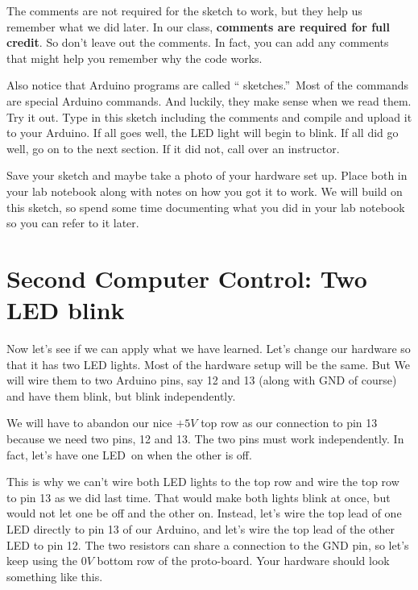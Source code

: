 The comments are not required for the sketch to work, but they help us
remember what we did later. In our class, \textbf{comments are required for
full credit}. So don't leave out the comments. In fact, you can add any
comments that might help you remember why the code works.

Also notice that Arduino programs are called \textquotedblleft
sketches.\textquotedblright\ Most of the commands are special Arduino
commands. And luckily, they make sense when we read them. Try it out. Type
in this sketch including the comments and compile and upload it to your
Arduino. If all goes well, the LED light will begin to blink. If all did go
well, go on to the next section. If it did not, call over an instructor.

Save your sketch and maybe take a photo of your hardware set up. Place both
in your lab notebook along with notes on how you got it to work. We will
build on this sketch, so spend some time documenting what you did in your
lab notebook so you can refer to it later.

\section{Second Computer Control: Two LED blink}

Now let's see if we can apply what we have learned. Let's change our
hardware so that it has two LED lights. Most of the hardware setup will be
the same. But We will wire them to two Arduino pins, say 12 and 13 (along
with GND of course) and have them blink, but blink independently.

We will have to abandon our nice $+5\unit{V}$ top row as our connection to
pin 13 because we need two pins, 12 and 13. The two pins must work
independently. In fact, let's have one LED\ on when the other is off.

This is why we can't wire both LED lights to the top row and wire the top
row to pin 13 as we did last time. That would make both lights blink at
once, but would not let one be off and the other on. Instead, let's wire the
top lead of one LED directly to pin 13 of our Arduino, and let's wire the
top lead of the other LED to pin 12. The two resistors can share a
connection to the GND pin, so let's keep using the $0\unit{V}$ bottom row of
the proto-board. Your hardware should look something like this.

